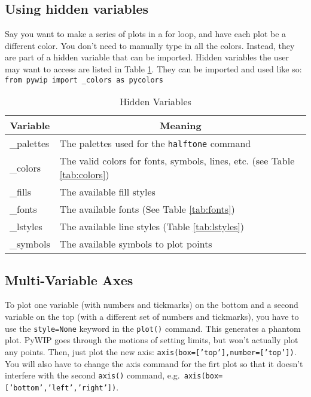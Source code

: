 \documentclass[12pt]{article}
\newcommand{\pywip}{PyWIP}
\begin{document}
\subsection{Using hidden variables}

Say you want to make a series of plots in a for loop, and have each plot be a
different color.  You don't need to manually type in all the colors.  Instead,
they are part of a hidden variable that can be imported.  Hidden variables
the user may want to access are listed in Table \ref{tab:hidden}.  They
can be imported and used like so:\\
\texttt{from pywip import \_colors as pycolors}

\begin{table}
\caption{\label{tab:hidden} Hidden Variables}
\begin{center}
\begin{tabular}{ll}
\hline
\hline
\multicolumn{1}{c}{Variable} & \multicolumn{1}{c}{Meaning}\\
\hline
\_palettes & The palettes used for the \texttt{halftone} command\\
\_colors   & The valid colors for fonts, symbols, lines, etc. (see Table
             \ref{tab:colors})\\
\_fills    & The available fill styles\\
\_fonts    & The available fonts (See Table \ref{tab:fonts})\\
\_lstyles  & The available line styles (Table \ref{tab:lstyles})\\
\_symbols  & The available symbols to plot points\\
\hline
\end{tabular}
\end{center}
\end{table}

\subsection{Multi-Variable Axes}

To plot one variable (with numbers and tickmarks) on the bottom and a second
variable  on the top (with a different set of numbers and tickmarks), you
have to use the \texttt{style=None} keyword in the \texttt{plot()} command.
This generates a phantom plot.  \pywip{} goes through the motions of setting
limits, but won't actually plot any points.  Then, just plot the new axis:
\texttt{axis(box=['top'],number=['top'])}.  You will also have to change the 
axis command for the firt plot so that it doesn't interfere with the second
\texttt{axis()} command, e.g.\ \texttt{axis(box=['bottom','left','right'])}.
\end{document}
